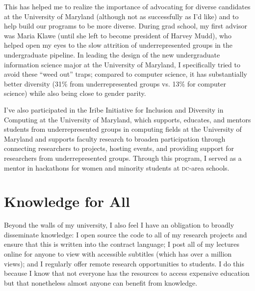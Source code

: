 \documentclass[11pt]{amsart}
\newcommand{\abr}[1]{\textsc{#1}}
\begin{document}
This has helped me to realize the importance of advocating for diverse
candidates at the University of Maryland (although not as successfully
as I'd like) and to help build our programs to be more diverse.
%
During grad school, my first advisor was Maria Klawe (until she left
to become president of Harvey Mudd), who helped open my eyes to the
slow attrition of underrepresented groups in the undergraduate
pipeline.
%
In leading the design of the new undergraduate information science major at the University of Maryland, I
specifically tried to avoid these ``weed out'' traps; compared to
computer science, it has substantially better diversity (31\% from
underrepresented groups vs. 13\% for computer science) while also
being close to gender parity.

I've also participated in the Iribe Initiative for Inclusion and Diversity
in Computing at the University of Maryland, which supports, educates,
and mentors students from underrepresented groups in computing fields
at the University of Maryland and supports faculty research to broaden
participation through connecting researchers to projects, hosting
events, and providing support for researchers from underrepresented
groups.
%
Through this program, I served as a mentor in hackathons for
women and minority students at \abr{dc}-area schools.

\section{Knowledge for All}

Beyond the walls of my university, I also feel I have an obligation to
broadly disseminate knowledge: I open source the code to all of my
research projects and ensure that this is written into the contract
language; I post all of my lectures online for anyone to view with
accessible subtitles (which has over a million views); and I regularly
offer remote research opportunities to students.
%
I do this because I know that not everyone has the resources to access
expensive education but that nonetheless almost anyone can benefit
from knowledge.




%
%
\end{document}
